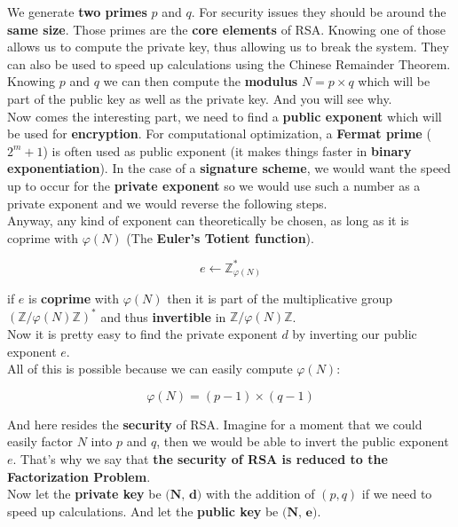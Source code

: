 \documentclass[a4paper,11pt]{article}
\begin{document}
We generate \textbf{two primes} $p$ and $q$. For security issues they should be around the \textbf{same size}. Those primes are the \textbf{core elements} of RSA. Knowing one of those allows us to compute the private key, thus allowing us to break the system. They can also be used to speed up calculations using the Chinese Remainder Theorem.\\
Knowing $p$ and $q$ we can then compute the \textbf{modulus} $N = p \times q$ which will be part of the public key as well as the private key. And you will see why.\\

Now comes the interesting part, we need to find a \textbf{public exponent} which will be used for \textbf{encryption}. For computational optimization, a \textbf{Fermat prime} ($2^{m} + 1$) is often used as public exponent (it makes things faster in \textbf{binary exponentiation}). In the case of a \textbf{signature scheme}, we would want the speed up to occur for the \textbf{private exponent} so we would use such a number as a private exponent and we would reverse the following steps.\\
Anyway, any kind of exponent can theoretically be chosen, as long as it is coprime with $\varphi(N)$ (The \textbf{Euler's Totient function}).

\[e \leftarrow \mathbb{Z}_{\varphi(N)}^{\ast}\]

if $e$ is \textbf{coprime} with $\varphi(N)$ then it is part of the multiplicative group $(\mathbb{Z}/\varphi(N)\mathbb{Z})^{\ast}$ and thus \textbf{invertible} in $\mathbb{Z}/\varphi(N)\mathbb{Z}$.\\

Now it is pretty easy to find the private exponent $d$ by inverting our public exponent $e$.\\

All of this is possible because we can easily compute $\varphi(N)$:

\[\varphi(N) = (p - 1) \times (q - 1)\]

And here resides the \textbf{security} of RSA. Imagine for a moment that we could easily factor $N$ into $p$ and $q$, then we would be able to invert the public exponent $e$. That's why we say that \textbf{the security of RSA is reduced to the Factorization Problem}.\\

Now let the \textbf{private key} be $\textbf{(N, d)}$ with the addition of $(p, q)$ if we need to speed up calculations.
And let the \textbf{public key} be $\textbf{(N, e)}$.
\end{document}
